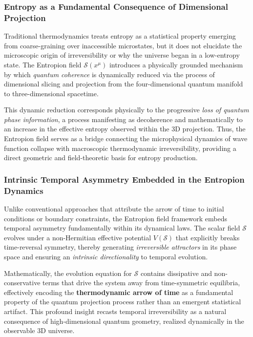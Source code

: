 \documentclass[12pt]{article}
\begin{document}
\subsubsection*{Entropy as a Fundamental Consequence of Dimensional Projection}

Traditional thermodynamics treats entropy as a statistical property emerging from coarse-graining over inaccessible microstates, but it does not elucidate the microscopic origin of irreversibility or why the universe began in a low-entropy state. The Entropion field $\mathcal{S}(x^\mu)$ introduces a physically grounded mechanism by which \emph{quantum coherence} is dynamically reduced via the process of dimensional slicing and projection from the four-dimensional quantum manifold to three-dimensional spacetime.

This dynamic reduction corresponds physically to the progressive \emph{loss of quantum phase information}, a process manifesting as decoherence and mathematically to an increase in the effective entropy observed within the 3D projection. Thus, the Entropion field serves as a bridge connecting the microphysical dynamics of wave function collapse with macroscopic thermodynamic irreversibility, providing a direct geometric and field-theoretic basis for entropy production.

\subsubsection*{Intrinsic Temporal Asymmetry Embedded in the Entropion Dynamics}

Unlike conventional approaches that attribute the arrow of time to initial conditions or boundary constraints, the Entropion field framework embeds temporal asymmetry fundamentally within its dynamical laws. The scalar field $\mathcal{S}$ evolves under a non-Hermitian effective potential $V(\mathcal{S})$ that explicitly breaks time-reversal symmetry, thereby generating \emph{irreversible attractors} in its phase space and ensuring an \emph{intrinsic directionality} to temporal evolution.

Mathematically, the evolution equation for $\mathcal{S}$ contains dissipative and non-conservative terms that drive the system away from time-symmetric equilibria, effectively encoding the \textbf{thermodynamic arrow of time} as a fundamental property of the quantum projection process rather than an emergent statistical artifact. This profound insight recasts temporal irreversibility as a natural consequence of high-dimensional quantum geometry, realized dynamically in the observable 3D universe.
\end{document}
